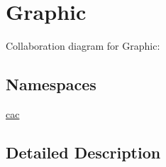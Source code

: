 \hypertarget{group__Graphic}{}\section{Graphic}
\label{group__Graphic}
Collaboration diagram for Graphic\+:
\subsection*{Namespaces}
\begin{DoxyCompactItemize}
\item 
 \hyperlink{namespacecac}{cac}
\end{DoxyCompactItemize}


\subsection{Detailed Description}
